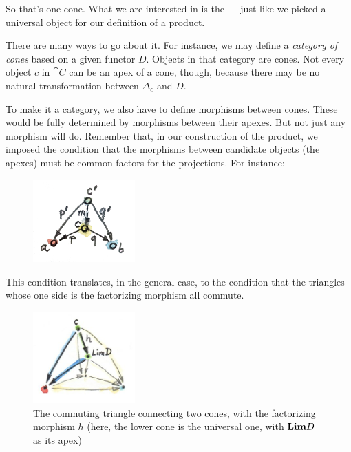 \noindent
So that's one cone. What we are interested in is the  --- just like we picked a universal object for our definition of a
product.

There are many ways to go about it. For instance, we may define a
\emph{category of cones} based on a given functor $D$. Objects in that
category are cones. Not every object $c$ in $\cat{C}$ can be an
apex of a cone, though, because there may be no natural transformation
between $\Delta_c$ and $D$.

To make it a category, we also have to define morphisms between cones.
These would be fully determined by morphisms between their apexes. But
not just any morphism will do. Remember that, in our construction of the
product, we imposed the condition that the morphisms between candidate
objects (the apexes) must be common factors for the projections. For
instance:


\begin{figure}[H]
\centering
\includegraphics[width=0.35\textwidth]{images/productranking.jpg}
\end{figure}

This condition translates, in the general case, to the condition that
the triangles whose one side is the factorizing morphism all commute.

\begin{figure}[H]
\centering
\includegraphics[width=0.35\textwidth]{images/conecommutativity.jpg}
\caption{The commuting triangle connecting two cones, with the factorizing
morphism $h$ (here, the lower cone is the universal one, with
$\Lim[D]$ as its apex)}
\end{figure}

